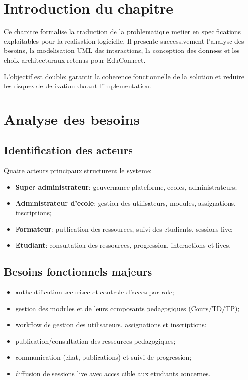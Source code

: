 ﻿\documentclass[12pt,a4paper,oneside]{report}
\begin{document}
\section{Introduction du chapitre}

Ce chapitre formalise la traduction de la problematique metier en specifications exploitables pour la realisation logicielle. Il presente successivement l'analyse des besoins, la modelisation UML des interactions, la conception des donnees et les choix architecturaux retenus pour EduConnect.

L'objectif est double: garantir la coherence fonctionnelle de la solution et reduire les risques de derivation durant l'implementation.

\section{Analyse des besoins}

\subsection{Identification des acteurs}

Quatre acteurs principaux structurent le systeme:
\begin{itemize}
  \item \textbf{Super administrateur}: gouvernance plateforme, ecoles, administrateurs;
  \item \textbf{Administrateur d'ecole}: gestion des utilisateurs, modules, assignations, inscriptions;
  \item \textbf{Formateur}: publication des ressources, suivi des etudiants, sessions live;
  \item \textbf{Etudiant}: consultation des ressources, progression, interactions et lives.
\end{itemize}

\subsection{Besoins fonctionnels majeurs}

\begin{itemize}
  \item authentification securisee et controle d'acces par role;
  \item gestion des modules et de leurs composants pedagogiques (Cours/TD/TP);
  \item workflow de gestion des utilisateurs, assignations et inscriptions;
  \item publication/consultation des ressources pedagogiques;
  \item communication (chat, publications) et suivi de progression;
  \item diffusion de sessions live avec acces cible aux etudiants concernes.
\end{itemize}
\end{document}
